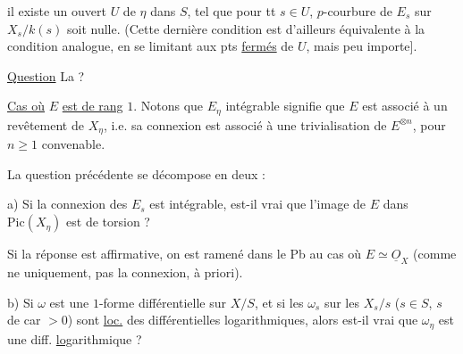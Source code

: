
il existe un  ouvert  $U$  de $\eta$ dans $S$, tel que pour tt $s\in U$,   $p$-courbure de $E_s$ sur $X_s/k(s)$ soit nulle.  (Cette dernière condition est d'ailleurs équivalente à la condition analogue,  en se limitant aux pts \uline{fermés} de $U$, mais peu importe].

\uline{Question} La  ?

\uline{Cas  où} $E$ \uline{est de rang} $1$. Notons que  $E_{\eta}$ intégrable signifie que $E$ est associé à un revêtement  de $X_{\eta}$, i.e.  sa connexion est associé à une trivialisation de $E^{\otimes n}$, pour $n\geq1$ convenable.

La question précédente se décompose en deux :


a) Si la connexion des $E_s$  est intégrable, est-il vrai que l'image de $E$ dans $\mathrm{Pic}(X_\eta)$ est de torsion ?

 Si la réponse est affirmative, on est ramené dans le Pb au cas où $E\simeq\underline O_X$ (comme ne uniquement, pas la connexion, à priori).


b) Si $\omega$ est une $1$-forme différentielle \inserted{[fermée]} sur $X/S$, et si les $\omega_s$ sur les $X_s/s$ ($s\in S$, $s$ de car $>0$) sont \uline{loc.} des différentielles logarithmiques, alors est-il vrai que  $\omega_\eta$ est une diff. \uline{log}arithmique ?



